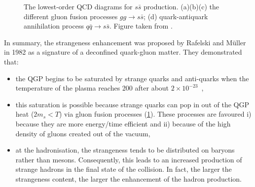 \begin{figure}[h]
\begin{minipage}{0.33\textwidth}
	\end{minipage}\par\medskip
	\centering
	\begin{minipage}{0.33\textwidth}
	\end{minipage}%
	\caption{The lowest-order QCD diagrams for $s\bar{s}$ production. (a)(b)(c) the
	 different gluon fusion processes $gg\rightarrow s\bar{s}$; (d) quark-antiquark annihilation process $q\bar{q} \rightarrow s\bar{s}$. Figure taken from \cite{maireProductionBaryonsMultietranges2011}.}
	\label{fig:StrangenessEnhancement}
\end{figure}



In summary, the strangeness enhancement was proposed by Rafelski and M\"{u}ller in 1982 as a signature of a deconfined quark-gluon matter. They demonstrated that:
\begin{itemize}
\item the QGP begins to be saturated by strange quarks and anti-quarks when the temperature of the plasma reaches 200 \mev after about $2 \times 10^{-23}$~\second,
\item this saturation is possible because strange quarks can pop in out of the QGP heat ($2 m_{s} < T$) via gluon fusion processes (\fig\ref{fig:StrangenessEnhancement}). These processes are favoured i) because they are more energy/time efficient and ii) because of the high density of gluons created out of the vacuum,
\item at the hadronisation, the strangeness tends to be distributed on baryons rather than mesons. Consequently, this leads to an increased production of strange hadrons in the final state of the collision. In fact, the larger the strangeness content, the larger the enhancement of the hadron production.\\
\end{itemize}

